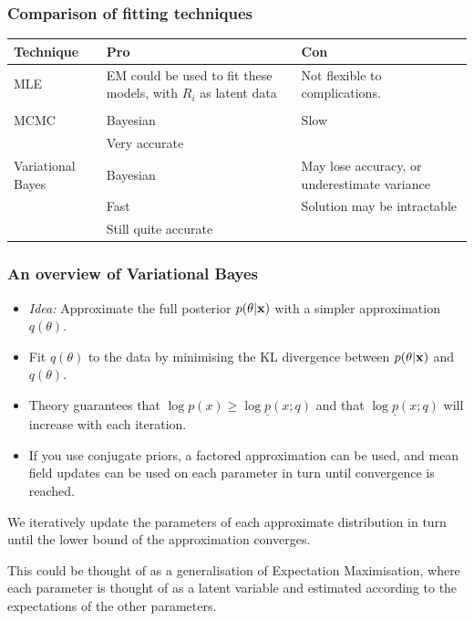 \documentclass{beamer}
\begin{document}

\begin{frame}
\frametitle{Comparison of fitting techniques}
\begin{tabular}{p{2cm}p{3.5cm}p{4.5cm}}
Technique & Pro & Con \\
\hline
MLE & EM could be used to fit these models, with $R_i$ as latent data & Not flexible to complications. \\
& & \\ %
\hline
MCMC & Bayesian & Slow \\
	& Very accurate &  \\
\hline
Variational Bayes & Bayesian & May lose accuracy, or underestimate variance \\
& Fast  & Solution may be intractable \\ 
& Still quite accurate & \\
\hline
\end{tabular}

\end{frame}

\begin{frame}
\frametitle{An overview of Variational Bayes}
\begin{itemize}
\item \emph{Idea:} Approximate the full posterior $p(\theta|{\bf x})$ with a simpler approximation $q(\theta)$.

\item Fit $q(\theta)$ to the data by minimising the KL divergence between $p(\theta|{\bf x})$ and $q(\theta)$.

\item Theory guarantees that $\log p(x)\ge 
\log \underline{p}(x;q)$ and that $\log \underline{p}(x;q)$ will
increase with each iteration.

\item If you use conjugate priors, a factored approximation can be used, and mean field updates can be used on
each parameter in turn until convergence is reached.
\end{itemize}

We iteratively update the parameters of each approximate distribution
in turn until the lower bound of the approximation converges.

This could be thought of as a generalisation of Expectation Maximisation, where each parameter is thought of as a latent
variable and estimated according to the expectations of the other parameters.
\end{frame}
\end{document}
